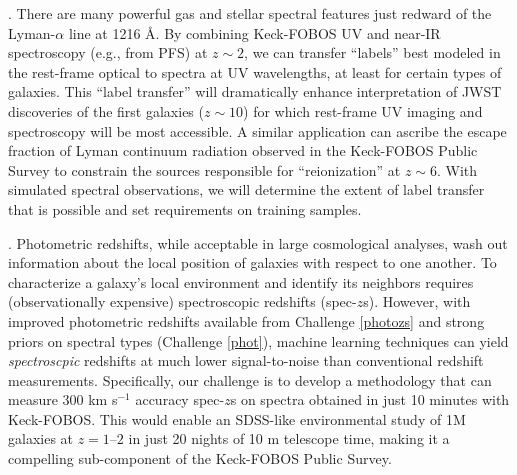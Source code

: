 \documentclass[oneside,11pt]{amsart}
\newcounter{chalno}
\newcommand{\chal}[1]{\refstepcounter{chalno}\label{#1}}
\begin{document}
\medskip
%
\chal{uv}
%
.  There are
many powerful gas and stellar spectral features just redward of the
Lyman-$\alpha$ line at 1216 \AA.  By combining Keck-FOBOS UV and near-IR
spectroscopy (e.g., from PFS) at $z \sim 2$, we can transfer ``labels''
best modeled in the rest-frame optical to spectra at UV wavelengths, at
least for certain types of galaxies.  This ``label transfer'' will
dramatically enhance interpretation of JWST discoveries of the first
galaxies ($z \sim 10$) for which rest-frame UV imaging and spectroscopy
will be most accessible.  A similar application can ascribe the escape
fraction of Lyman continuum radiation observed in the Keck-FOBOS Public
Survey to constrain the sources responsible for ``reionization'' at $z
\sim 6$.  With simulated spectral observations, we will determine the
extent of label transfer that is possible and set requirements on
training samples.


\medskip
%
\chal{lowsnr}
%
.  Photometric
redshifts, while acceptable in large cosmological analyses, wash out
information about the local position of galaxies with respect to one
another.  To characterize a galaxy's local environment and identify its
neighbors requires (observationally expensive) spectroscopic redshifts
(spec-$z$s).  However, with improved photometric redshifts available
from Challenge \ref{photozs} and strong priors on spectral types
(Challenge \ref{phot}), machine learning techniques can yield
\emph{spectroscpic} redshifts at much lower signal-to-noise than
conventional redshift measurements. Specifically, our challenge is to
develop a methodology that can measure 300 km s$^{-1}$ accuracy
spec-$z$s on spectra obtained in just 10 minutes with Keck-FOBOS.  This
would enable an SDSS-like environmental study of 1M galaxies at
$z=1$--$2$ in just 20 nights of 10 m telescope time, making it a
compelling sub-component of the Keck-FOBOS Public Survey.






\end{document}
